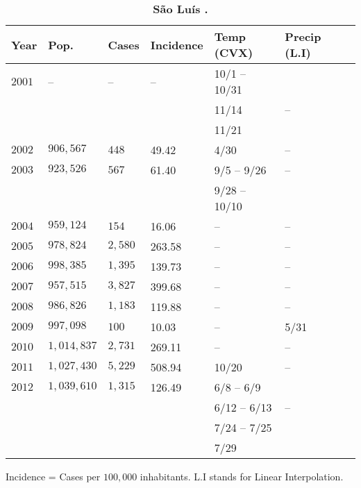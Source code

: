 \documentclass[final,leqno]{siamltexmm2}
\begin{document}
\begin{table}[t]
\centering
\caption{
{\bf S\~ao Lu\'is .}}
\begin{tabular}{|l|l|l|l|l|l|l|}
\hline
\multicolumn{1}{|l|}{\bf Year} & \multicolumn{1}{|l|}{\bf Pop.} & \multicolumn{1}{|l|}{\bf Cases}&\multicolumn{1}{|l|}{\bf Incidence}&\multicolumn{1}{|l|}{\bf Temp (CVX)} & \multicolumn{1}{|l|}{\bf Precip (L.I)} \\ \hline %
$2001$ & -- & --  &  --  & 10/1 -- 10/31  &    \\ 
       &  &   &    & 11/14   & --   \\ 
       & &   &    & 11/21  &    \\ \hline
$2002$ & $ 906,567$ & $448$  &  \cellcolor{blue!25}49.42 & 4/30 &   -- \\ \hline
$2003$ & $923,526 $ & $567$  &  \cellcolor{blue!25}61.40  &  9/5 -- 9/26 & -- \\ 
       &            &        &  \cellcolor{blue!25}       & 9/28 -- 10/10  & \\ \hline
$2004$ & $ 959,124  $ & $154 $   &  \cellcolor{blue!25}16.06 & -- & -- \\\hline
$2005$ & $978,824$ & $ 2,580$   &  \cellcolor{red!25}263.58 & -- & --   \\ \hline
$2006$ & $998,385$ & $1,395 $   &  \cellcolor{red!25}139.73 & -- & --  \\ \hline
$2007$ & $957,515 $ & $3,827$    &  \cellcolor{red!25}399.68  & -- & --  \\ \hline
$2008$ & $986,826$ & $1,183$ & \cellcolor{red!25}119.88  & -- & --  \\ \hline
$2009$ & $ 997,098$ & $100$  &  \cellcolor{blue!25}10.03  & -- & 5/31 \\ \hline
$2010$ & $ 1,014,837$ & $2,731$    &  \cellcolor{red!25}269.11 & -- &  -- \\ \hline
$2011$ & $1,027,430 $ & $5,229$  & \cellcolor{red!25}508.94  & 10/20 & --  \\ \hline
$2012$ & $1,039,610$ & $1,315$  & \cellcolor{red!25}126.49  &  6/8 -- 6/9   &     \\ 
       &             &          & \cellcolor{red!25}        & 6/12 -- 6/13   &  --    \\ 
       &             &          & \cellcolor{red!25}        &   7/24 -- 7/25  & \\ 
       &             &          & \cellcolor{red!25}        &   7/29  & \\ \hline
\end{tabular}
\begin{flushleft} 
\vspace{.5cm}
Incidence = Cases per $100,000$ inhabitants.  L.I stands for Linear Interpolation.
\end{flushleft}
\label{table8}
\end{table}
\end{document}
